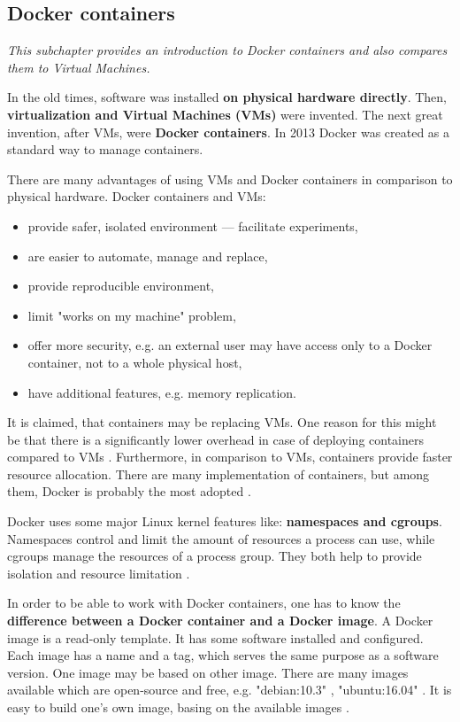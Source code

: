 \subsection{Docker containers}
\textit{This subchapter provides an introduction to Docker containers and also compares them to Virtual Machines.}

In the old times, software was installed \textbf{on physical hardware directly}. Then, \textbf{virtualization and Virtual Machines (VMs)} were invented. The next great invention, after VMs, were \textbf{Docker containers}. In 2013 Docker was created as a standard way to manage containers\cite{book-devops-k8s}.

There are many advantages of using VMs and Docker containers in comparison to physical hardware. Docker containers and VMs:
\begin{itemize}
\item provide safer, isolated environment --- facilitate experiments,
\item are easier to automate, manage and replace,
\item provide reproducible environment,
\item limit "works on my machine" problem,
\item offer more security, e.g. an external user may have access only to a Docker container, not to a whole physical host,
\item have additional features, e.g. memory replication.
\end{itemize}

It is claimed, that containers may be replacing VMs. One reason for this might be that there is a significantly lower overhead in case of deploying containers compared to VMs \cite{article-modelling-performance-k8s}. Furthermore, in comparison to VMs, containers provide faster resource allocation. There are many implementation of containers, but among them, Docker is probably the most adopted \cite{article-state-machine}.

Docker uses some major Linux kernel features like: \textbf{namespaces and cgroups}. Namespaces control and limit the amount of resources a process can use, while cgroups manage the resources of a process group. They both help to provide isolation and resource limitation \cite{art-byza,book-devops-k8s}.

In order to be able to work with Docker containers, one has to know the \textbf{difference between a Docker container and a Docker image}. A Docker image is a read-only template. It has some software installed and configured. Each image has a name and a tag, which serves the same purpose as a software version. One image may be based on other image. There are many images available which are open-source and free, e.g. "debian:10.3" \cite{online-dh-debian}, "ubuntu:16.04" \cite{online-dh-ubuntu}. It is easy to build one’s own image, basing on the available images \cite{online-docker-doc}.

